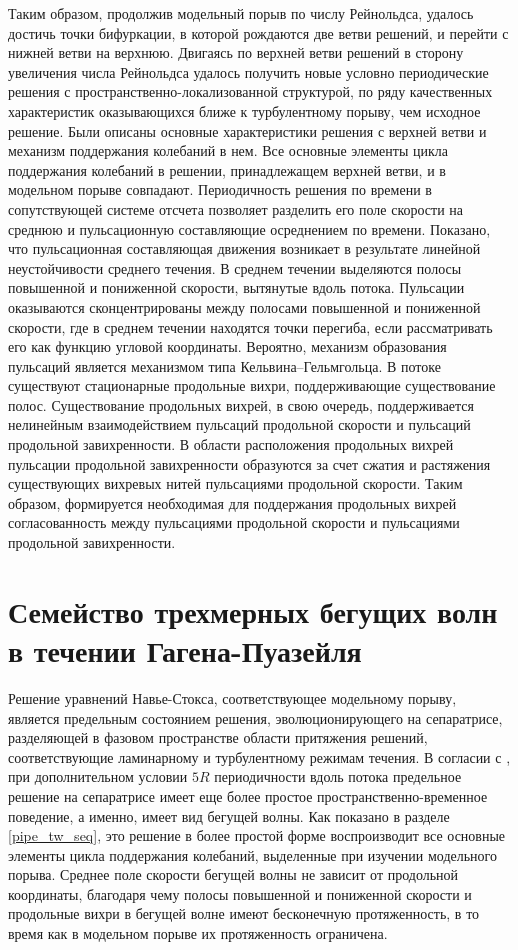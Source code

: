 Таким образом, продолжив модельный порыв по числу Рейнольдса, удалось достичь точки бифуркации, в которой рождаются две ветви решений, и перейти с нижней ветви на верхнюю. Двигаясь по верхней ветви решений в сторону увеличения числа Рейнольдса удалось получить новые условно периодические решения с пространственно-локализованной структурой, по ряду качественных характеристик оказывающихся ближе к турбулентному порыву, чем исходное решение. Были описаны основные характеристики решения с верхней ветви и механизм поддержания колебаний в нем. Все основные элементы цикла поддержания колебаний в решении, принадлежащем верхней ветви, и в модельном порыве совпадают. Периодичность решения по времени в сопутствующей системе отсчета позволяет разделить его поле скорости на среднюю и пульсационную составляющие осреднением по времени. Показано, что пульсационная составляющая движения возникает в результате линейной неустойчивости среднего течения. В среднем течении выделяются полосы повышенной и пониженной скорости, вытянутые вдоль потока. Пульсации оказываются сконцентрированы между полосами повышенной и пониженной скорости, где в среднем течении находятся точки перегиба, если рассматривать его как функцию угловой координаты. Вероятно, механизм образования пульсаций является механизмом типа Кельвина--Гельмгольца. В потоке существуют стационарные продольные вихри, поддерживающие существование полос. Существование продольных вихрей, в свою очередь, поддерживается нелинейным взаимодействием пульсаций продольной скорости и пульсаций продольной завихренности. В области расположения продольных вихрей пульсации продольной завихренности образуются за счет сжатия и растяжения существующих вихревых нитей пульсациями продольной скорости. Таким образом, формируется необходимая для поддержания продольных вихрей согласованность между пульсациями продольной скорости и пульсациями продольной завихренности. 

\section{Семейство трехмерных бегущих волн в течении Гагена-Пуазейля} \label{pipeTW_seq}

Решение уравнений Навье-Стокса, соответствующее модельному порыву, является предельным состоянием решения, эволюционирующего на сепаратрисе, разделяющей в фазовом пространстве области притяжения решений, соответствующие ламинарному и турбулентному режимам течения. В согласии с \cite{Avila2013}, при дополнительном условии $5R$ периодичности вдоль потока предельное решение на сепаратрисе имеет еще более простое пространственно-временное поведение, а именно, имеет вид бегущей волны. Как показано в разделе \ref{pipe_tw_seq}, это решение в более простой форме воспроизводит все основные элементы цикла поддержания колебаний, выделенные при изучении модельного порыва. Среднее поле скорости бегущей волны не зависит от продольной координаты, благодаря чему полосы повышенной и пониженной скорости и продольные вихри в бегущей волне имеют бесконечную протяженность, в то время как в модельном порыве их протяженность ограничена. 

